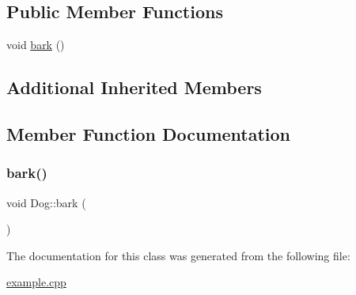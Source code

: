 \subsection*{Public Member Functions}
\begin{DoxyCompactItemize}
\item 
void \hyperlink{classDog_ad3ab5661e3663948a486ff73049b1e1f}{bark} ()
\end{DoxyCompactItemize}
\subsection*{Additional Inherited Members}


\subsection{Member Function Documentation}
\mbox{\label{classDog_ad3ab5661e3663948a486ff73049b1e1f}} 
\subsubsection{\texorpdfstring{bark()}{bark()}}
{\footnotesize\ttfamily void Dog\+::bark (\begin{DoxyParamCaption}{ }\end{DoxyParamCaption})}



The documentation for this class was generated from the following file\+:\begin{DoxyCompactItemize}
\item 
\hyperlink{example_8cpp}{example.\+cpp}\end{DoxyCompactItemize}
